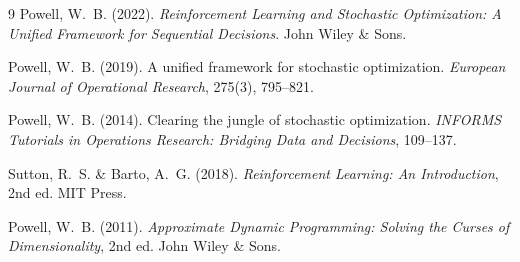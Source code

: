 \documentclass[11pt, a4paper]{article}
\begin{document}
\begin{thebibliography}{9}
Powell, W.~B. (2022).
\textit{Reinforcement Learning and Stochastic Optimization: A Unified Framework for Sequential Decisions}.
John Wiley \& Sons.

Powell, W.~B. (2019).
A unified framework for stochastic optimization.
\textit{European Journal of Operational Research}, 275(3), 795--821.

Powell, W.~B. (2014).
Clearing the jungle of stochastic optimization.
\textit{INFORMS Tutorials in Operations Research: Bridging Data and Decisions}, 109--137.

Sutton, R.~S. \& Barto, A.~G. (2018).
\textit{Reinforcement Learning: An Introduction}, 2nd ed. MIT Press.

Powell, W.~B. (2011).
\textit{Approximate Dynamic Programming: Solving the Curses of Dimensionality}, 2nd ed. John Wiley \& Sons.
\end{thebibliography}
\end{document}
